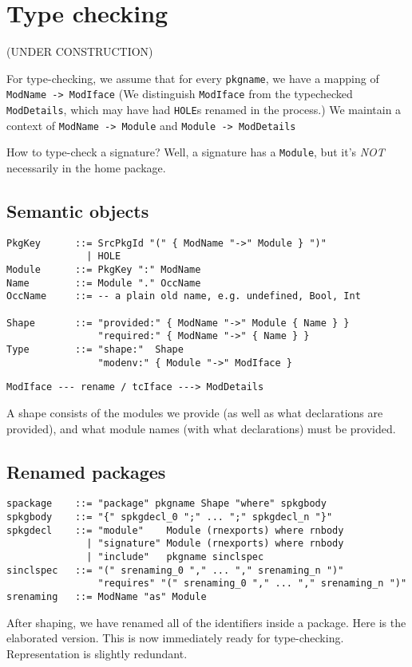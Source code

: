\documentclass{article}
\newcommand{\Red}[1]{{\color{red} #1}}
\begin{document}
\newpage

\section{Type checking}

(UNDER CONSTRUCTION)

%
%

For type-checking, we assume that for every \verb|pkgname|, we have a mapping of \verb|ModName -> ModIface| (We distinguish \verb|ModIface| from the typechecked \verb|ModDetails|, which may have had \verb|HOLE|s renamed in the process.)  We maintain a context of \verb|ModName -> Module| and \verb|Module -> ModDetails|

How to type-check a signature?  Well, a signature has a \verb|Module|, but it's \emph{NOT} necessarily in the home package.

\subsection{Semantic objects}

\begin{verbatim}
PkgKey      ::= SrcPkgId "(" { ModName "->" Module } ")"
              | HOLE
Module      ::= PkgKey ":" ModName
Name        ::= Module "." OccName
OccName     ::= -- a plain old name, e.g. undefined, Bool, Int

Shape       ::= "provided:" { ModName "->" Module { Name } }
                "required:" { ModName "->" { Name } }
Type        ::= "shape:"  Shape
                "modenv:" { Module "->" ModIface }
\end{verbatim}

\begin{verbatim}
ModIface --- rename / tcIface ---> ModDetails
\end{verbatim}

A shape consists of the modules we provide (as well as what declarations
are provided), and what module names (with what declarations) must
be provided.

\subsection{Renamed packages}

\begin{verbatim}
spackage    ::= "package" pkgname Shape "where" spkgbody
spkgbody    ::= "{" spkgdecl_0 ";" ... ";" spkgdecl_n "}"
spkgdecl    ::= "module"    Module (rnexports) where rnbody
              | "signature" Module (rnexports) where rnbody
              | "include"   pkgname sinclspec
sinclspec   ::= "(" srenaming_0 "," ... "," srenaming_n ")"
                "requires" "(" srenaming_0 "," ... "," srenaming_n ")"
srenaming   ::= ModName "as" Module
\end{verbatim}

After shaping, we have renamed all of the identifiers inside a package.
Here is the elaborated version.  This is now immediately ready for
type-checking.  \Red{Representation is slightly redundant.}
\end{document}
